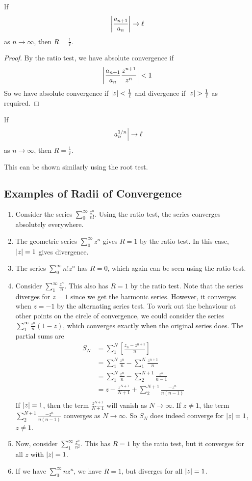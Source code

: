 \documentclass{article}
\begin{document}
\begin{lemma}
    If
    \[ \abs{\frac{a_{n+1}}{a_n}} \to \ell \]
    as $n \to \infty$, then $R = \frac{1}{\ell}$.
\end{lemma}
\begin{proof}
    By the ratio test, we have absolute convergence if
    \[ \abs{\frac{a_{n+1}}{a_n} \frac{z^{n+1}}{z^n}} < 1 \]
    So we have absolute convergence if $\abs{z} < \frac{1}{\ell}$ and divergence if $\abs{z} > \frac{1}{\ell}$ as required.
\end{proof}
\begin{lemma}
    If
    \[ \abs{a_n^{1/n}} \to \ell \]
    as $n \to \infty$, then $R = \frac{1}{\ell}$.
\end{lemma}
\noindent This can be shown similarly using the root test.

\subsection{Examples of Radii of Convergence}
\begin{enumerate}
    \item Consider the series $\sum_0^\infty \frac{z^n}{n!}$. Using the ratio test, the series converges absolutely everywhere.
    \item The geometric series $\sum_0^\infty z^n$ gives $R=1$ by the ratio test. In this case, $\abs{z} = 1$ gives divergence.
    \item The series $\sum_0^\infty n!z^n$ has $R=0$, which again can be seen using the ratio test.
    \item Consider $\sum_1^\infty \frac{z^n}{n}$. This also has $R = 1$ by the ratio test. Note that the series diverges for $z=1$ since we get the harmonic series. However, it converges when $z = -1$ by the alternating series test. To work out the behaviour at other points on the circle of convergence, we could consider the series $\sum_1^\infty \frac{z^n}{n}(1-z)$, which converges exactly when the original series does. The partial sums are
          \begin{align*}
              S_N & = \sum_1^N \left[ \frac{z_n - z^{n+1}}{n} \right]            \\
                  & = \sum_1^N \frac{z^n}{n} - \sum_1^N \frac{z^{n+1}}{n}        \\
                  & = \sum_1^N \frac{z^n}{n} - \sum_2^{N+1} \frac{z^n}{n-1}      \\
                  & = z - \frac{z^{N+1}}{N+1} + \sum_2^{N+1} \frac{-z^n}{n(n-1)} \\
          \end{align*}
          If $\abs{z} = 1$, then the term $\frac{z^{N+1}}{N+1}$ will vanish as $N \to \infty$. If $z \neq 1$, the term $\sum_2^{N+1} \frac{-z^n}{n(n-1)}$ converges as $N \to \infty$. So $S_N$ does indeed converge for $\abs{z} = 1$, $z \neq 1$.
    \item Now, consider $\sum_1^\infty \frac{z^n}{n^2}$. This has $R=1$ by the ratio test, but it converges for all $z$ with $\abs{z} = 1$.
    \item If we have $\sum_0^\infty nz^n$, we have $R=1$, but diverges for all $\abs{z} = 1$.
\end{enumerate}
\end{document}
